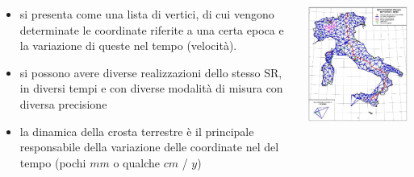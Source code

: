 \documentclass{beamer}
\begin{document}
{\begin{frame}
    \begin{columns}
        \begin{column}{0.68\textwidth}
            \begin{itemize}
                \item {\scriptsize si presenta come una lista di vertici, di cui vengono determinate le coordinate riferite a una certa epoca e la variazione di queste nel tempo (velocità).}
        		\item {\scriptsize si possono avere diverse realizzazioni dello stesso SR, in diversi tempi e con diverse modalità di misura con diversa precisione}
        		\item {\scriptsize la dinamica della crosta terrestre è il principale responsabile della variazione delle coordinate nel del tempo (pochi $mm$ o qualche $cm$ / $y$)}
            \end{itemize}
        \end{column}
        \begin{column}{0.32\textwidth}
            \begin{center}
                \includegraphics[width=1\textwidth] {./pics_2022_03/frame_Roma40.png}
            \end{center}
        \end{column}
        

\end{columns}
\end{frame}}
\end{document}
